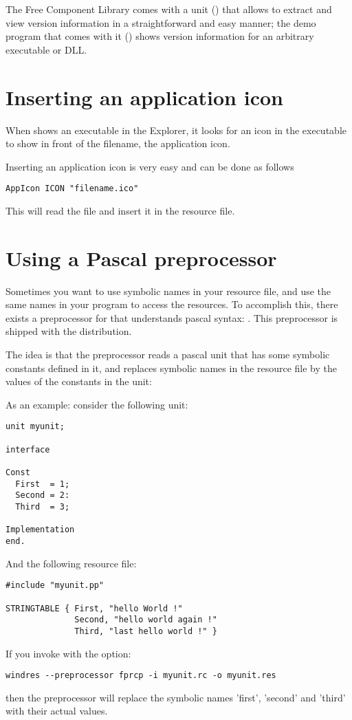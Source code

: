 The Free Component Library comes with a unit () that allows
to extract and view version information in a straightforward and easy manner;
the demo program that comes with it () shows version information
for an arbitrary executable or DLL.

\section{Inserting an application icon}

When \windows shows an executable in the Explorer, it looks for an icon
in the executable to show in front of the filename, the application
icon.

Inserting an application icon is very easy and can be done as follows
\begin{verbatim}
AppIcon ICON "filename.ico"
\end{verbatim}
This will read the file  and insert it in the
resource file.

\section{Using a Pascal preprocessor}

Sometimes you want to use symbolic names in your resource file, and
use the same names in your program to access the resources. To accomplish
this, there exists a preprocessor for  that understands pascal
syntax: . This preprocessor is shipped with the \fpc
distribution.

The idea is that the preprocessor reads a pascal unit that has some
symbolic constants defined in it, and replaces symbolic names in the
resource file by the values of the constants in the unit:

As an example: consider the following unit:
\begin{verbatim}
unit myunit;

interface

Const
  First  = 1;
  Second = 2:
  Third  = 3;

Implementation
end.
\end{verbatim}
And the following resource file:
\begin{verbatim}
#include "myunit.pp"

STRINGTABLE { First, "hello World !"
              Second, "hello world again !"
              Third, "last hello world !" }

\end{verbatim}
If you invoke  with the  option:
\begin{verbatim}
windres --preprocessor fprcp -i myunit.rc -o myunit.res
\end{verbatim}
then the preprocessor will replace the symbolic names 'first', 'second'
and 'third' with their actual values.

